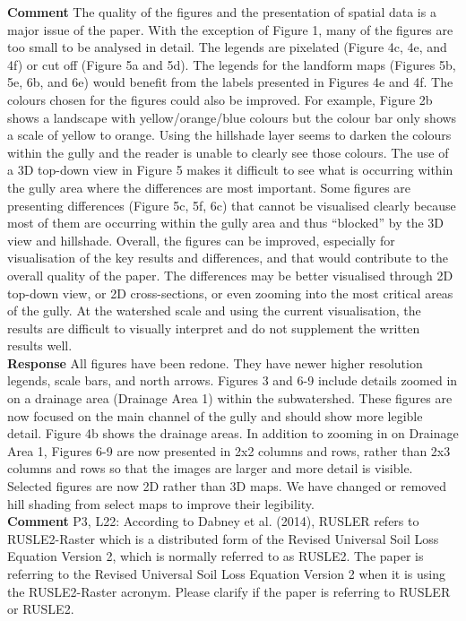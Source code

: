\documentclass[gmd, manuscript]{copernicus}
\begin{document}
\noindent\textbf{Comment}
The quality of the figures and the presentation of spatial data is a major issue of the paper. With the exception of Figure 1, many of the figures are too small to be analysed in detail. The legends are pixelated (Figure 4c, 4e, and 4f) or cut off (Figure 5a and 5d). The legends for the landform maps (Figures 5b, 5e, 6b, and 6e) would benefit from the labels presented in Figures 4e and 4f. The colours chosen for the figures could also be improved. For example, Figure 2b shows a landscape with yellow/orange/blue colours but the colour bar only shows a scale of yellow to orange. Using the hillshade layer seems to darken the colours within the gully and the reader is unable to clearly see those colours. The use of a 3D top-down view in Figure 5 makes it difficult to see what is occurring within the gully area where the differences are most important. Some figures are presenting differences (Figure 5c, 5f, 6c) that cannot be visualised clearly because most of them are occurring within the gully area and thus “blocked” by the 3D view and hillshade. Overall, the figures can be improved, especially for visualisation of the key results and differences, and that would contribute to the overall quality of the paper. The differences may be better visualised through 2D top-down view, or 2D cross-sections, or even zooming into the most critical areas of the gully. At the watershed scale and using the current visualisation, the results are difficult to visually interpret and do not supplement the written results well.
\\

\noindent\textbf{Response}
All figures have been redone. They have newer higher resolution legends, scale bars, and north arrows. Figures 3 and 6-9  include details zoomed in on a drainage area (Drainage Area 1) within the subwatershed. These figures are now focused on the main channel of the gully and should show more legible detail. Figure 4b shows the drainage areas. In addition to zooming in on Drainage Area 1, Figures 6-9 are now presented in 2x2 columns and rows, rather than 2x3 columns and rows so that the images are larger and more detail is visible. Selected figures are now 2D rather than 3D maps. We have changed or removed hill shading from select maps to improve their legibility.
\\

\noindent\textbf{Comment}
P3, L22: According to Dabney et al. (2014), RUSLER refers to RUSLE2-Raster which is a distributed form of the Revised Universal Soil Loss Equation Version 2, which is normally referred to as RUSLE2. The paper is referring to the Revised Universal Soil Loss Equation Version 2 when it is using the RUSLE2-Raster acronym. Please clarify if the paper is referring to RUSLER or RUSLE2.
\\
\end{document}
